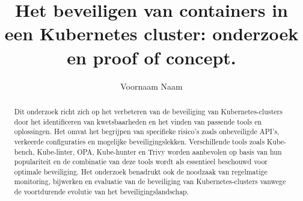 \documentclass[a0,portrait]{hogent-poster}
\title{Het beveiligen van containers in een Kubernetes cluster: onderzoek en proof of concept.}
\author{Voornaam Naam}
\begin{document}
\maketitle

\begin{abstract}

Dit onderzoek richt zich op het verbeteren van de beveiliging van Kubernetes-clusters door het identificeren van kwetsbaarheden en het vinden van passende tools en oplossingen. Het omvat het begrijpen van specifieke risico's zoals onbeveiligde API's, verkeerde configuraties en mogelijke beveiligingslekken. Verschillende tools zoals Kube-bench, Kube-linter, OPA, Kube-hunter en Trivy worden aanbevolen op basis van hun populariteit en de combinatie van deze tools wordt als essentieel beschouwd voor optimale beveiliging. Het onderzoek benadrukt ook de noodzaak van regelmatige monitoring, bijwerken en evaluatie van de beveiliging van Kubernetes-clusters vanwege de voortdurende evolutie van het beveiligingslandschap.

\end{abstract}
\end{document}
